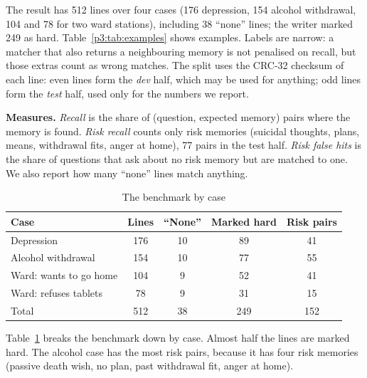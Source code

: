 \documentclass[journal]{IEEEtran}
\begin{document}
The result has 512 lines over four cases (176 depression, 154 alcohol withdrawal, 104 and 78 for two ward stations), including 38 ``none'' lines;
the writer marked 249 as hard. Table~\ref{p3:tab:examples} shows examples. Labels are narrow: a matcher that also returns a neighbouring memory is not
penalised on recall, but those extras count as wrong matches. The split uses the CRC-32 checksum of each line: even lines form the \emph{dev} half,
which may be used for anything; odd lines form the \emph{test} half, used only for the numbers we report.

\textbf{Measures.} \emph{Recall} is the share of (question, expected memory) pairs where the memory is found. \emph{Risk recall} counts only risk
memories (suicidal thoughts, plans, means, withdrawal fits, anger at home), 77 pairs in the test half. \emph{Risk false hits} is the share of
questions that ask about no risk memory but are matched to one. We also report how many ``none'' lines match anything.

\begin{table}[t]
\caption{The benchmark by case}
\label{p3:tab:benchstats}
\centering
\footnotesize
\begin{tabular}{@{}lcccc@{}}
\toprule
Case & Lines & ``None'' & Marked hard & Risk pairs\\
\midrule
Depression & 176 & 10 & 89 & 41\\
Alcohol withdrawal & 154 & 10 & 77 & 55\\
Ward: wants to go home & 104 & 9 & 52 & 41\\
Ward: refuses tablets & 78 & 9 & 31 & 15\\
\midrule
Total & 512 & 38 & 249 & 152\\
\bottomrule
\end{tabular}
\end{table}

Table~\ref{p3:tab:benchstats} breaks the benchmark down by case. Almost half the lines are marked hard. The alcohol case has the most risk pairs,
because it has four risk memories (passive death wish, no plan, past withdrawal fit, anger at home).
\end{document}
